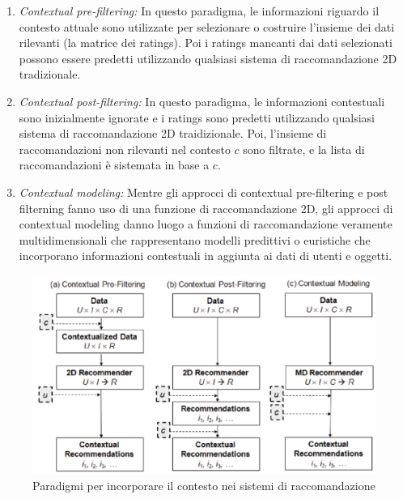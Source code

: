 \documentclass[12pt,italian]{report}
\begin{document}
\begin{enumerate}
 \item \textit{Contextual pre-filtering:} In questo paradigma, le informazioni riguardo il contesto attuale sono utilizzate per selezionare o costruire l'insieme dei dati rilevanti (la matrice dei ratings). Poi i ratings mancanti dai dati selezionati possono essere predetti utilizzando qualsiasi sistema di raccomandazione 2D tradizionale.
 \item \textit{Contextual post-filtering:} In questo paradigma, le informazioni contestuali sono inizialmente ignorate e i ratings sono predetti utilizzando qualsiasi sistema di raccomandazione 2D traidizionale. Poi, l'insieme di raccomandazioni non rilevanti nel contesto $c$ sono filtrate, e la lista di raccomandazioni è sistemata in base a $c$.
 \item  \textit{Contextual modeling:} Mentre gli approcci di contextual pre-filtering e post filterning fanno uso di una funzione di raccomandazione 2D, gli approcci di contextual modeling danno luogo a funzioni di raccomandazione veramente multidimensionali che rappresentano modelli predittivi o euristiche che incorporano informazioni contestuali in aggiunta ai dati di utenti e oggetti.
\end{enumerate}

\begin{figure}
  \includegraphics[width=\linewidth]{immagini/paradigm_for_context_inclusion.png}
  \caption{Paradigmi per incorporare il contesto nei sistemi di raccomandazione}
  \label{fig:context-paradigm}
\end{figure}
\end{document}
